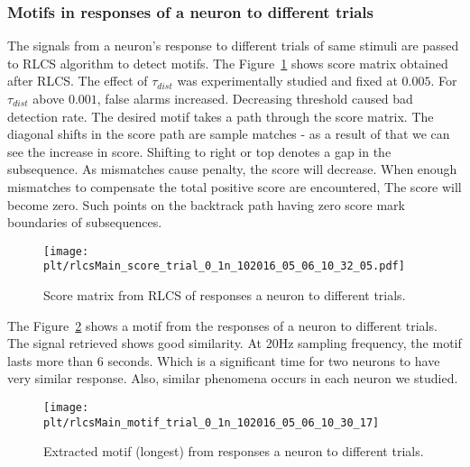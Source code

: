 \documentclass[MTech]{iitmdiss}
\newcommand{\plt}{thesis_plots}
\begin{document}
\subsubsection{Motifs in responses of a neuron to different trials} %
\label{ssub:motifs_in_responses_of_a_neuron_to_different_trials}
The signals from a neuron's response to different trials of same stimuli are passed to RLCS algorithm to detect motifs. The Figure~\ref{img:score_trial} shows score matrix obtained after RLCS. The effect of $\tau_{dist}$ was experimentally studied and fixed at $0.005$. For $\tau_{dist}$ above $0.001$, false alarms increased. Decreasing threshold caused bad detection rate. The desired motif takes a path through the score matrix. The diagonal shifts in the score path are sample matches - as a result of that we can see the increase in score. Shifting to right or top denotes a gap in the subsequence. As mismatches cause penalty, the score will decrease. When enough mismatches to compensate the total positive score are encountered, The score will become zero. Such points on the backtrack path having zero score mark boundaries of subsequences.
\begin{figure}[h]
    \centering
    \texttt{[image: \\plt/rlcsMain\_score\_trial\_0\_1n\_102016\_05\_06\_10\_32\_05.pdf]}
    \caption{Score matrix from RLCS of responses a neuron to different trials.}
    \label{img:score_trial}
\end{figure}

The Figure~\ref{img:motif_trial} shows a motif from the responses of a neuron to different trials. The signal retrieved shows good similarity. At 20Hz sampling frequency, the motif lasts more than $6$ seconds. Which is a significant time for two neurons to have very similar response. Also, similar phenomena occurs in each neuron we studied.
\begin{figure}[h]
    \centering
    \texttt{[image: \\plt/rlcsMain\_motif\_trial\_0\_1n\_102016\_05\_06\_10\_30\_17]}
    \caption{Extracted motif (longest) from responses a neuron to different trials.}
    \label{img:motif_trial}
\end{figure}
\end{document}
